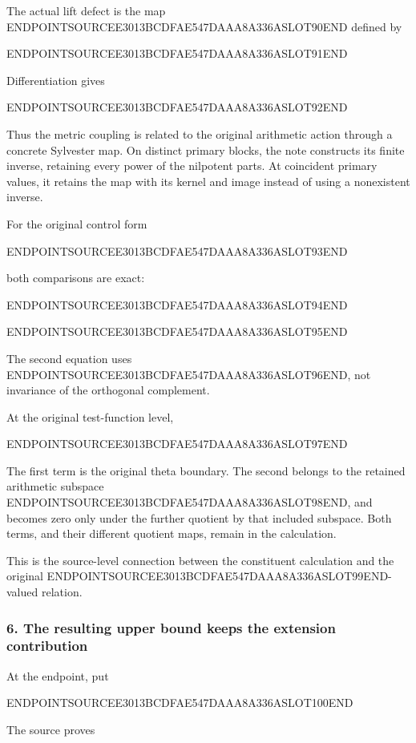 The actual lift defect is the map ENDPOINTSOURCEE3013BCDFAE547DAAA8A336ASLOT90END defined by

ENDPOINTSOURCEE3013BCDFAE547DAAA8A336ASLOT91END

Differentiation gives

ENDPOINTSOURCEE3013BCDFAE547DAAA8A336ASLOT92END

Thus the metric coupling is related to the original arithmetic action through a concrete Sylvester map. On distinct primary blocks, the note constructs its finite inverse, retaining every power of the nilpotent parts. At coincident primary values, it retains the map with its kernel and image instead of using a nonexistent inverse.

For the original control form

ENDPOINTSOURCEE3013BCDFAE547DAAA8A336ASLOT93END

both comparisons are exact:

ENDPOINTSOURCEE3013BCDFAE547DAAA8A336ASLOT94END

ENDPOINTSOURCEE3013BCDFAE547DAAA8A336ASLOT95END

The second equation uses ENDPOINTSOURCEE3013BCDFAE547DAAA8A336ASLOT96END, not invariance of the orthogonal complement.

At the original test-function level,

ENDPOINTSOURCEE3013BCDFAE547DAAA8A336ASLOT97END

The first term is the original theta boundary. The second belongs to the retained arithmetic subspace ENDPOINTSOURCEE3013BCDFAE547DAAA8A336ASLOT98END, and becomes zero only under the further quotient by that included subspace. Both terms, and their different quotient maps, remain in the calculation.

This is the source-level connection between the constituent calculation and the original ENDPOINTSOURCEE3013BCDFAE547DAAA8A336ASLOT99END-valued relation.

\subsubsection{6. The resulting upper bound keeps the extension contribution}\label{endpoint-exponential_constituent_original--the-resulting-upper-bound-keeps-the-extension-contribution}

At the endpoint, put

ENDPOINTSOURCEE3013BCDFAE547DAAA8A336ASLOT100END

The source proves

